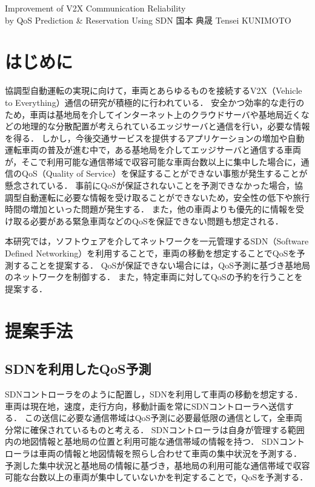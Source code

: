 \documentclass[a4paper,10pt,twocolumn,uplatex]{jsarticle}
\date{8}
\begin{document}
{Improvement of V2X Communication Reliability\\by QoS Prediction \& Reservation Using SDN}
{国本 典晟}
{Tensei KUNIMOTO}

\section{はじめに}
協調型自動運転の実現に向けて，車両とあらゆるものを接続するV2X（Vehicle to Everything）通信の研究が積極的に行われている．
安全かつ効率的な走行のため，車両は基地局を介してインターネット上のクラウドサーバや基地局近くなどの地理的な分散配置が考えられているエッジサーバ\cite{ETSI}と通信を行い，必要な情報を得る．
しかし，今後交通サービスを提供するアプリケーションの増加や自動運転車両の普及が進む中で，ある基地局を介してエッジサーバと通信する車両が，そこで利用可能な通信帯域で収容可能な車両台数以上に集中した場合に，通信のQoS（Quality of Service）を保証することができない事態が発生することが懸念されている\cite{SDNMEC}．
事前にQoSが保証されないことを予測できなかった場合，協調型自動運転に必要な情報を受け取ることができないため，安全性の低下や旅行時間の増加といった問題が発生する．
また，他の車両よりも優先的に情報を受け取る必要がある緊急車両などのQoSを保証できない問題も想定される．\par
本研究では，ソフトウェアを介してネットワークを一元管理するSDN（Software Defined Networking）を利用することで，車両の移動を想定することでQoSを予測することを提案する．
QoSが保証できない場合には，QoS予測に基づき基地局のネットワークを制御する．
また，特定車両に対してQoSの予約を行うことを提案する．

\section{提案手法}
\subsection{SDNを利用したQoS予測}
\label{QoSprediction}
SDNコントローラをのように配置し，SDNを利用して車両の移動を想定する．
車両は現在地，速度，走行方向，移動計画を常にSDNコントローラへ送信する．
この送信に必要な通信帯域はQoS予測に必要最低限の通信として，全車両分常に確保されているものと考える．
SDNコントローラは自身が管理する範囲内の地図情報と基地局の位置と利用可能な通信帯域の情報を持つ．
SDNコントローラは車両の情報と地図情報を照らし合わせて車両の集中状況を予測する．
予測した集中状況と基地局の情報に基づき，基地局の利用可能な通信帯域で収容可能な台数以上の車両が集中していないかを判定することで，QoSを予測する．
\end{document}
